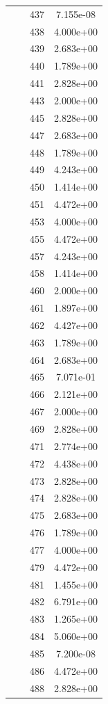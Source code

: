 \documentclass[12pt]{article}
\begin{document}
\begin{longtable}{@{}cccc@{}}
 &  & 437 & 7.155e-08 \\
 &  & 438 & 4.000e+00 \\
 &  & 439 & 2.683e+00 \\
 &  & 440 & 1.789e+00 \\
 &  & 441 & 2.828e+00 \\
 &  & 443 & 2.000e+00 \\
 &  & 445 & 2.828e+00 \\
 &  & 447 & 2.683e+00 \\
 &  & 448 & 1.789e+00 \\
 &  & 449 & 4.243e+00 \\
 &  & 450 & 1.414e+00 \\
 &  & 451 & 4.472e+00 \\
 &  & 453 & 4.000e+00 \\
 &  & 455 & 4.472e+00 \\
 &  & 457 & 4.243e+00 \\
 &  & 458 & 1.414e+00 \\
 &  & 460 & 2.000e+00 \\
 &  & 461 & 1.897e+00 \\
 &  & 462 & 4.427e+00 \\
 &  & 463 & 1.789e+00 \\
 &  & 464 & 2.683e+00 \\
 &  & 465 & 7.071e-01 \\
 &  & 466 & 2.121e+00 \\
 &  & 467 & 2.000e+00 \\
 &  & 469 & 2.828e+00 \\
 &  & 471 & 2.774e+00 \\
 &  & 472 & 4.438e+00 \\
 &  & 473 & 2.828e+00 \\
 &  & 474 & 2.828e+00 \\
 &  & 475 & 2.683e+00 \\
 &  & 476 & 1.789e+00 \\
 &  & 477 & 4.000e+00 \\
 &  & 479 & 4.472e+00 \\
 &  & 481 & 1.455e+00 \\
 &  & 482 & 6.791e+00 \\
 &  & 483 & 1.265e+00 \\
 &  & 484 & 5.060e+00 \\
 &  & 485 & 7.200e-08 \\
 &  & 486 & 4.472e+00 \\
 &  & 488 & 2.828e+00 \\

\end{longtable}
\end{document}
